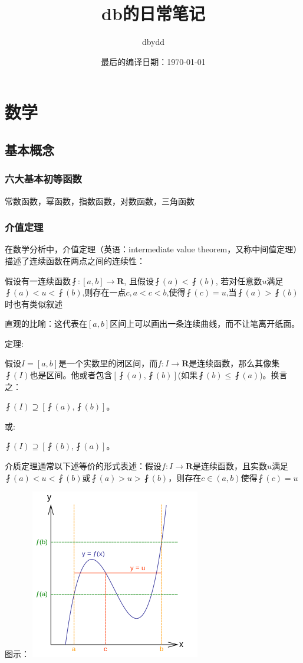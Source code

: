 \documentclass[UTF8]{ctexbook}
\title{db的日常笔记}
\date{最后的编译日期：\today}
\author{dbydd}
\begin{document}
\setcounter{page}{1}
\chapter{数学}{
\section{基本概念}{
\subsection{六大基本初等函数}{
  常数函数，幂函数，指数函数，对数函数，三角函数
}

\subsection{介值定理}{
在数学分析中，介值定理（英语：intermediate value theorem，又称中间值定理）描述了连续函数在两点之间的连续性：

假设有一连续函数$\fint:[a,b]\rightarrow \mathbf{R}$, 且假设$\fint(a)<\fint(b)$, 若对任意数$u$满足$\fint(a)<u<\fint(b)$,则存在一点$c,a<c<b$,使得$\fint(c) = u$,当$\fint(a)>\fint(b)$时也有类似叙述

直观的比喻：这代表在$[a,b]$区间上可以画出一条连续曲线，而不让笔离开纸面。
\newline

定理:

假设$I = [a,b]$是一个实数里的闭区间，而$f:I\rightarrow\mathbf{R}$是连续函数，那么其像集$\fint(I)$也是区间。他或者包含$[\fint(a),\fint(b)]$(如果$\fint(b)\leq\fint(a)$)。换言之：

$\fint(I)\supseteq[\fint(a),\fint(b)]$。

或:

$\fint(I)\supseteq[\fint(b), \fint(a)]$。

介质定理通常以下述等价的形式表述：假设$f:I\rightarrow\mathbf{R}$是连续函数，且实数$u$满足$\fint(a)<u<\fint(b)$或$\fint(a)>u>\fint(b)$，则存在$c\in(a,b)$使得$\fint(c) = u$

图示：
\includegraphics{resources/Intermediatevaluetheorem.png}
}

}}
\end{document}
